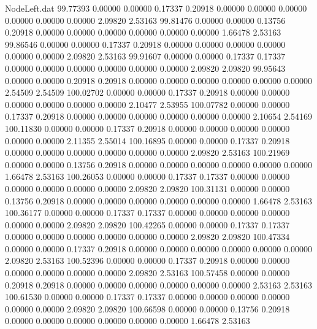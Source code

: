 \begin{filecontents}{NodeLeft.dat}
  99.77393    0.00000    0.00000     0.17337    0.20918    0.00000    0.00000    0.00000    0.00000    0.00000    0.00000    2.09820    2.53163
  99.81476    0.00000    0.00000     0.13756    0.20918    0.00000    0.00000    0.00000    0.00000    0.00000    0.00000    1.66478    2.53163
  99.86546    0.00000    0.00000     0.17337    0.20918    0.00000    0.00000    0.00000    0.00000    0.00000    0.00000    2.09820    2.53163
  99.91607    0.00000    0.00000     0.17337    0.17337    0.00000    0.00000    0.00000    0.00000    0.00000    0.00000    2.09820    2.09820
  99.95643    0.00000    0.00000     0.20918    0.20918    0.00000    0.00000    0.00000    0.00000    0.00000    0.00000    2.54509    2.54509
 100.02702    0.00000    0.00000     0.17337    0.20918    0.00000    0.00000    0.00000    0.00000    0.00000    0.00000    2.10477    2.53955
 100.07782    0.00000    0.00000     0.17337    0.20918    0.00000    0.00000    0.00000    0.00000    0.00000    0.00000    2.10654    2.54169
 100.11830    0.00000    0.00000     0.17337    0.20918    0.00000    0.00000    0.00000    0.00000    0.00000    0.00000    2.11355    2.55014
 100.16895    0.00000    0.00000     0.17337    0.20918    0.00000    0.00000    0.00000    0.00000    0.00000    0.00000    2.09820    2.53163
 100.21969    0.00000    0.00000     0.13756    0.20918    0.00000    0.00000    0.00000    0.00000    0.00000    0.00000    1.66478    2.53163
 100.26053    0.00000    0.00000     0.17337    0.17337    0.00000    0.00000    0.00000    0.00000    0.00000    0.00000    2.09820    2.09820
 100.31131    0.00000    0.00000     0.13756    0.20918    0.00000    0.00000    0.00000    0.00000    0.00000    0.00000    1.66478    2.53163
 100.36177    0.00000    0.00000     0.17337    0.17337    0.00000    0.00000    0.00000    0.00000    0.00000    0.00000    2.09820    2.09820
 100.42265    0.00000    0.00000     0.17337    0.17337    0.00000    0.00000    0.00000    0.00000    0.00000    0.00000    2.09820    2.09820
 100.47334    0.00000    0.00000     0.17337    0.20918    0.00000    0.00000    0.00000    0.00000    0.00000    0.00000    2.09820    2.53163
 100.52396    0.00000    0.00000     0.17337    0.20918    0.00000    0.00000    0.00000    0.00000    0.00000    0.00000    2.09820    2.53163
 100.57458    0.00000    0.00000     0.20918    0.20918    0.00000    0.00000    0.00000    0.00000    0.00000    0.00000    2.53163    2.53163
 100.61530    0.00000    0.00000     0.17337    0.17337    0.00000    0.00000    0.00000    0.00000    0.00000    0.00000    2.09820    2.09820
 100.66598    0.00000    0.00000     0.13756    0.20918    0.00000    0.00000    0.00000    0.00000    0.00000    0.00000    1.66478    2.53163

\end{filecontents}

